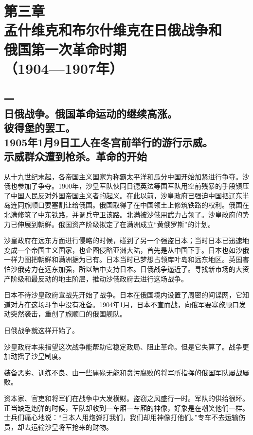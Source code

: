 \section[第三章\q 孟什维克和布尔什维克在日俄战争和俄国第一次革命时期（1904—1907年）]{第三章\\ 孟什维克和布尔什维克在日俄战争和\\俄国第一次革命时期\\{（1904—1907年）}}

\subsection[一\q 日俄战争。俄国革命运动的继续高涨。彼得堡的罢工。1905年1月9日工人在冬宫前举行的游行示威。示威群众遭到枪杀。革命的开始]{一\\ 日俄战争。俄国革命运动的继续高涨。\\ 彼得堡的罢工。\\ 1905年1月9日工人在冬宫前举行的游行示威。\\ 示威群众遭到枪杀。革命的开始}

从十九世纪末起，各帝国主义国家为称霸太平洋和瓜分中国开始加紧进行争夺。沙俄也参加了争夺。1900年，沙皇军队伙同日德英法等国军队用空前残暴的手段镇压了中国人民反对外国帝国主义者的起义。在此以前，沙皇政府已强迫中国把辽东半岛连同旅顺口要塞割让给俄国。俄国取得了在中国领土上修筑铁路的权利。俄国在北满修筑了中东铁路，并调兵守卫该路。北满被沙俄用武力占领了。沙皇政府的势力已伸展到朝鲜。俄国资产阶级拟定了在满洲成立“黄俄罗斯”的计划。

沙皇政府在远东方面进行侵略的时候，碰到了另一个强盗日本；当时日本已迅速地变成一个帝国主义国家，也企图侵略亚洲大陆，首先是从中国下手。日本也如沙俄一样力图把朝鲜和满洲据为已有。日本当时已梦想占领库叶岛和远东地区。英国害怕沙俄势力在远东加强，所以暗中支持日本。日俄战争逼近了。寻找新市场的大资产阶级和最反动的地主阶层，推动沙俄政府去进行这场战争。

日本不待沙皇政府宣战先开始了战争。日本在俄国境内设置了周密的间谍网，它知道对方在这场斗争中没有准备。1904年1月，日本不宣而战，向俄军要塞旅顺口发动突然袭击，重创了旅顺口的俄国舰队。

日俄战争就这样开始了。

沙皇政府本来指望这次战争能帮助它稳定政局、阻止革命。但是它失算了。战争更加动摇了沙皇制度。

装备恶劣、训练不良、由一些庸碌无能和贪污腐败的将军所指挥的俄国军队屡战屡败。

资本家、官吏和将军们在战争中大发横财。盗窃之风盛行一时。军队的供给很坏。正当缺乏炮弹的时候，军队却收到一车厢一车厢的神像，好象是在嘲笑他们一样。士兵们痛心地说：“日本人用炮弹打我们，我们却用神像打他们。”专车不去运输伤员，却去运输沙皇将军抢来的财物。

